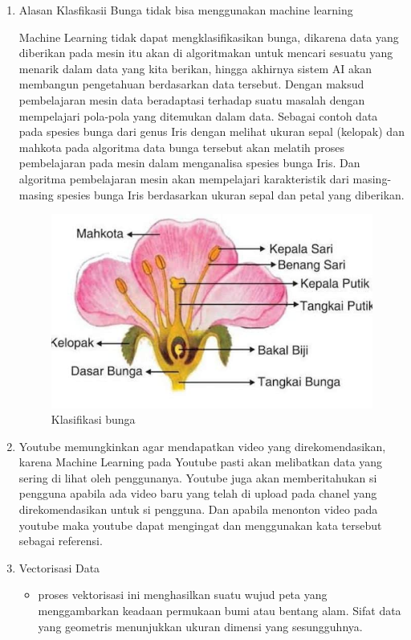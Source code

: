 \begin{enumerate}
\item Alasan Klasfikasii Bunga tidak bisa menggunakan machine learning
\par Machine Learning tidak dapat mengklasifikasikan bunga, dikarena data yang diberikan pada  mesin itu akan di algoritmakan untuk mencari sesuatu yang menarik dalam data yang kita berikan, hingga akhirnya sistem AI akan membangun pengetahuan berdasarkan data tersebut. Dengan maksud pembelajaran mesin data beradaptasi terhadap suatu masalah dengan mempelajari pola-pola yang ditemukan dalam data. Sebagai contoh data pada spesies bunga dari genus Iris dengan melihat ukuran sepal (kelopak) dan mahkota pada algoritma data bunga tersebut akan melatih proses pembelajaran pada mesin dalam menganalisa spesies bunga Iris. Dan algoritma pembelajaran mesin akan mempelajari karakteristik dari masing-masing spesies bunga Iris berdasarkan ukuran sepal dan petal yang diberikan.
\begin{figure}[ht]
\centering
\includegraphics[scale=0.5]{figures/ch4/2.jpg}
\caption{Klasifikasi bunga}
\label{Ilustrasi Klasifikasi Bunga}
\end{figure}

\item
Youtube memungkinkan agar mendapatkan video yang direkomendasikan, karena Machine Learning pada Youtube pasti akan melibatkan data yang sering di lihat oleh penggunanya. Youtube juga akan memberitahukan si pengguna apabila ada video baru yang telah di upload pada chanel yang direkomendasikan untuk si pengguna. Dan apabila menonton video pada youtube maka youtube dapat mengingat dan menggunakan kata tersebut sebagai referensi.

\item Vectorisasi Data
\begin{itemize}
\item proses vektorisasi ini menghasilkan suatu wujud peta yang menggambarkan keadaan permukaan bumi atau bentang alam. Sifat data yang geometris menunjukkan ukuran dimensi yang sesungguhnya.
\end{itemize}
	

\end{enumerate}
